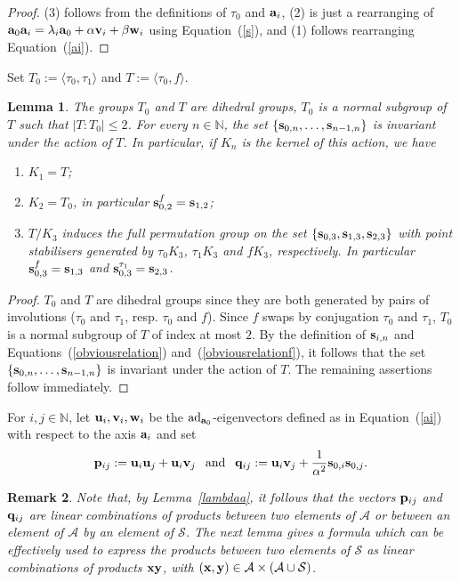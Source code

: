 \documentclass[a4paper]{amsart}
\newtheorem{lemma}{Lemma}[section]
\newtheorem{remark}[lemma]{Remark}
\newcommand{\N}{{\mathbb N}}
\newcommand{\ad}{{\rm ad}}
\newcommand{\bv}{{\bf v}}
\newcommand{\ba}{{\bf a}}
\newcommand{\bw}{{\bf w}}
\newcommand{\bu}{{\bf u}}
\newcommand{\bs}{{\bf s}}
\newcommand{\bp}{{\bf p}}
\newcommand{\bq}{{\bf q}}
\begin{document}
\begin{proof}
(3) follows from the definitions of $\tau_0$ and $\ba_i$, 
(2) is just a rearranging of $\ba_0\ba_i=\lambda_i  \ba_0+\alpha \bv_i +\beta \bw_i$ using Equation~(\ref{s}), and (1) follows rearranging Equation~(\ref{ai}). \end{proof} 


 
Set $T_0:=\langle \tau_0, \tau_1\rangle$ and $T:=\langle \tau_0, f\rangle$.

\begin{lemma}\label{action}
The groups $T_0$ and $T$ are dihedral groups, $T_0$ is a normal subgroup of $T$ such that $|T:T_0|\leq 2$. 
For every $n\in \N$, the set $\{\bs_{0, n}, \ldots , \bs_{n-1,n}\}$ is invariant under the action of $T$. In particular, if $K_n$ is the kernel of this action, we have 
\begin{enumerate}
\item $K_1=T$;
\item $K_2=T_0$, in particular $\bs_{0,2}^f=\bs_{1,2}$; 
\item $T/K_3$ induces the full permutation group on the set $\{\bs_{0, 3}, \bs_{1, 3}, \bs_{2,3}\}$ with point stabilisers generated by $\tau_0K_3$, $\tau_1K_3$ and $fK_3$, respectively. In particular $\bs_{0,3}^f=\bs_{1,3}$ and $\bs_{0,3}^{\tau_1}=\bs_{2,3}$. 
\end{enumerate}  
\end{lemma}
\begin{proof}
$T_0$ and $T$ are dihedral groups since they are both generated by pairs of involutions ($\tau_0$ and $\tau_1$, resp. $\tau_0$ and $f$). Since $f$ swaps by conjugation $\tau_0$ and $\tau_1$, $T_0$ is a normal subgroup of $T$ of index at most $2$. By the definition of $\bs_{i,n}$ and Equations~(\ref{obviousrelation}) and~(\ref{obviousrelationf}), it follows that the set $\{\bs_{0, n}, \ldots , \bs_{n-1,n}\}$ is invariant under the action of $T$. The remaining assertions follow immediately.
\end{proof}

For $i,j\in \N$, let $\bu_i, \bv_i, \bw_i$ be the $\ad_{\ba_0}$-eigenvectors defined as in Equation~(\ref{ai}) with respect to the axis $\ba_i$ and set
 \begin{equation}\label{pq}
 \bp_{ij}:=\bu_i\bu_j + \bu_i\bv_j\:\: \mbox{ and } \:\:\bq_{ij}:=\bu_i \bv_j+\frac{1}{\alpha^2}\bs_{0,i}\bs_{0,j}.
 \end{equation}

\begin{remark}\label{remarkproducts}
Note that, by Lemma~\ref{lambdaa}, it follows that the vectors $\bp_{ij}$  and $\bq_{ij}$ are linear combinations of products between two elements of $\mathcal A$ or between an element of $\mathcal A$ by an element of $\mathcal S$. The next lemma gives a formula which can be effectively used to express the products between two elements of $\mathcal S$ as linear combinations of products $\bf x\bf y$, with $(\bf x, \bf y)\in \mathcal A\times (\mathcal A\cup \mathcal S)$.%
\end{remark}
 
\end{document}
